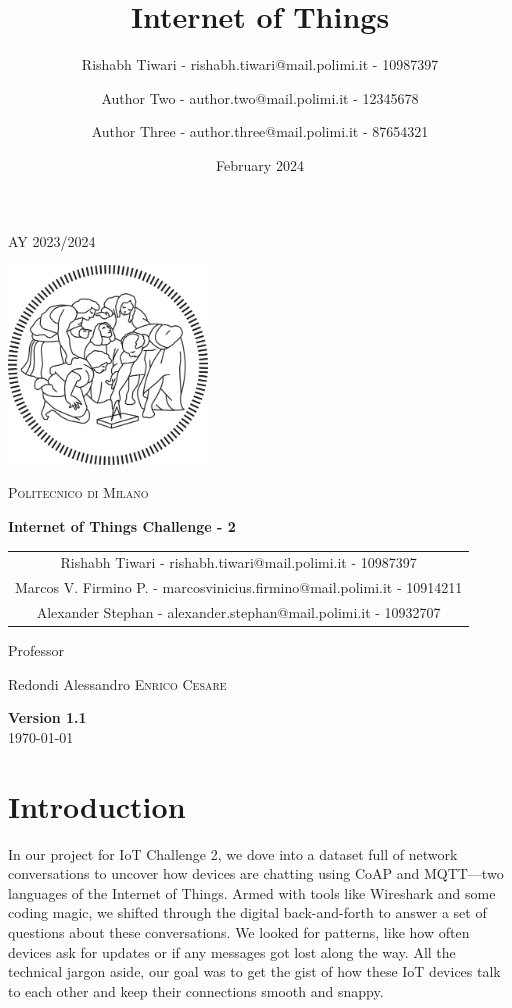 \documentclass{article}
\title{Internet of Things}
\author{%
Rishabh Tiwari - rishabh.tiwari@mail.polimi.it - 10987397 \and
Author Two - author.two@mail.polimi.it - 12345678 \and
Author Three - author.three@mail.polimi.it - 87654321
}
\date{February 2024}
\begin{document}
\begin{titlepage}
    \centering
    {\scshape\large AY 2023/2024 \par}
    \vfill
    \includegraphics[width=150pt]{Images/PolimiLogo.png}\par\vspace{1cm}
    {\scshape\LARGE Politecnico di Milano \par}
    \vspace{1.5cm}
    {\huge\bfseries Internet of Things Challenge - 2\par}
    \vspace{2cm}
    {\Large \begin{tabular}{c}
    Rishabh Tiwari - rishabh.tiwari@mail.polimi.it - 10987397\\
    Marcos V. Firmino P. - marcosvinicius.firmino@mail.polimi.it
 - 10914211\\
    Alexander Stephan - alexander.stephan@mail.polimi.it - 10932707
    \end{tabular}\par}
    \vfill
    {\large Professor\par
        Redondi Alessandro \textsc{Enrico Cesare}}
    \vfill
    {\large \textbf{Version 1.1}\\ \today \par}
\end{titlepage}
\thispagestyle{plain}
\mbox{}
\section{Introduction}

In our project for IoT Challenge 2, we dove into a dataset full of network conversations to uncover how devices are chatting using CoAP and MQTT—two languages of the Internet of Things. Armed with tools like Wireshark and some coding magic, we shifted through the digital back-and-forth to answer a set of questions about these conversations. We looked for patterns, like how often devices ask for updates or if any messages got lost along the way. All the technical jargon aside, our goal was to get the gist of how these IoT devices talk to each other and keep their connections smooth and snappy.
\end{document}
